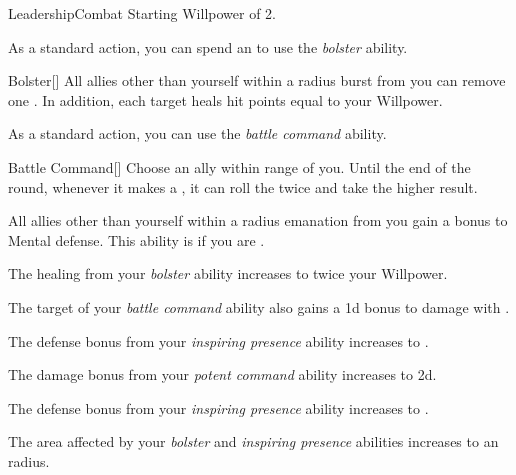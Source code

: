     \begin{feat}{Leadership}{Combat}
        \featpre Starting Willpower of 2.

         As a standard action, you can spend an  to use the \textit{bolster} ability.
        \begin{ability}{Bolster}[]
            All allies other than yourself within a \areamed radius burst from you can remove one .
            In addition, each target heals hit points equal to your Willpower.
        \end{ability}

         As a standard action, you can use the \textit{battle command} ability.
        \begin{ability}{Battle Command}[]
            Choose an ally within \rngmed range of you.
            Until the end of the round, whenever it makes a , it can roll the  twice and take the higher result.
        \end{ability}

         All allies other than yourself within a \arealarge radius emanation from you gain a  bonus to Mental defense.
        This ability is  if you are .

         The healing from your \textit{bolster} ability increases to twice your Willpower.

         The target of your \textit{battle command} ability also gains a \plus1d bonus to damage with .

         The defense bonus from your \textit{inspiring presence} ability increases to .

         The damage bonus from your \textit{potent command} ability increases to \plus2d.

         The defense bonus from your \textit{inspiring presence} ability increases to .

         The area affected by your \textit{bolster} and \textit{inspiring presence} abilities increases to an \areahuge radius.
    \end{feat}

